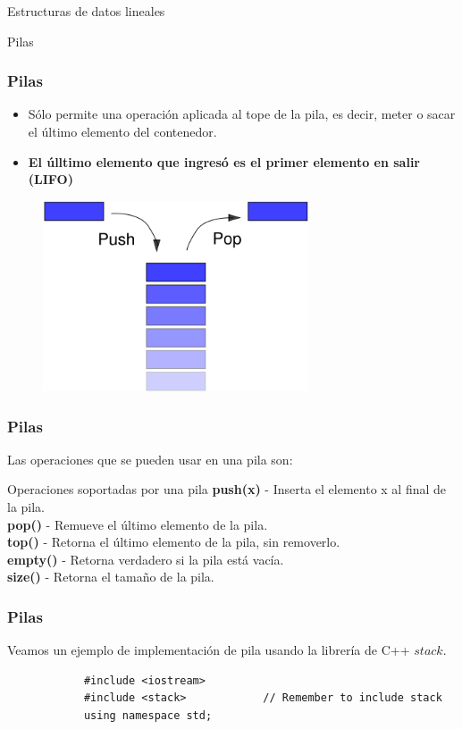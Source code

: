 \documentclass{beamer}
\begin{document}
\begin{section}{Estructuras de datos lineales}
\begin{subsection}{Pilas}
	\begin{frame}[fragile]
		\frametitle{Pilas}
		\begin{itemize}
			\item {Sólo permite una operación aplicada al tope de la pila, es decir, meter o sacar el último elemento del contenedor.}
			\item {\textbf{El úlltimo elemento que ingresó es el primer elemento en salir (LIFO)}}
		\end{itemize}
		\begin{figure}
			\includegraphics[width = 0.7\textwidth]{src/pila.jpg}
		\end{figure}
	\end{frame}

	\begin{frame}[fragile]
		\frametitle{Pilas}
		Las operaciones que se pueden usar en una pila son:
		\begin{block}{Operaciones soportadas por una pila}
			\textbf{push(x)} - Inserta el elemento x al final de la pila.\\
			\textbf{pop()} - Remueve el último elemento de la pila.\\
			\textbf{top()} - Retorna el último elemento de la pila, sin removerlo.\\
			\textbf{empty()} - Retorna verdadero si la pila está vacía.\\
			\textbf{size()} - Retorna el tamaño de la pila.			
		\end{block}		
	\end{frame}
	
	\begin{frame}[fragile]
		\frametitle{Pilas}
		Veamos un ejemplo de implementación de pila usando la librería de C++ $stack$.
		\begin{lstlisting}
			#include <iostream>
			#include <stack>            // Remember to include stack
			using namespace std;


\end{lstlisting}
\end{frame}
\end{subsection}
\end{section}
\end{document}
